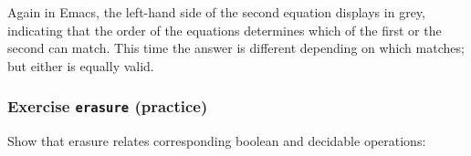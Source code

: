 Again in Emacs, the left-hand side of the second equation displays in
grey, indicating that the order of the equations determines which of the
first or the second can match. This time the answer is different
depending on which matches; but either is equally valid.

\hypertarget{exercise-erasure-practice}{%
\subsubsection{\texorpdfstring{Exercise \texttt{erasure}
(practice)}{Exercise erasure (practice)}}\label{exercise-erasure-practice}}

Show that erasure relates corresponding boolean and decidable
operations:

\begin{fence}
\begin{code}%
\>[0]\<%
\\
\>[0][@{}l@{\AgdaIndent{0}}]%
\>[2]\AgdaSpace{}%
\AgdaSymbol{:}\AgdaSpace{}%
\AgdaSpace{}%
\AgdaSymbol{\{}\AgdaSpace{}%
\AgdaSpace{}%
\AgdaSymbol{:}\AgdaSpace{}%
\AgdaSymbol{\}}\AgdaSpace{}%
\AgdaSymbol{(}\AgdaSpace{}%
\AgdaSymbol{:}\AgdaSpace{}%
\AgdaSpace{}%
\AgdaSymbol{)}\AgdaSpace{}%
\AgdaSymbol{(}\AgdaSpace{}%
\AgdaSymbol{:}\AgdaSpace{}%
\AgdaSpace{}%
\AgdaSymbol{)}\AgdaSpace{}%
\AgdaSpace{}%
\AgdaSpace{}%
\AgdaSpace{}%
\AgdaSpace{}%
\AgdaSpace{}%
\AgdaSpace{}%
\AgdaSpace{}%
\AgdaSpace{}%
\AgdaSpace{}%
\AgdaSpace{}%
\AgdaSpace{}%
\AgdaSpace{}%
\AgdaSpace{}%
\<%
\\
%
\>[2]\AgdaSpace{}%
\AgdaSymbol{:}\AgdaSpace{}%
\AgdaSpace{}%
\AgdaSymbol{\{}\AgdaSpace{}%
\AgdaSpace{}%
\AgdaSymbol{:}\AgdaSpace{}%
\AgdaSymbol{\}}\AgdaSpace{}%
\AgdaSymbol{(}\AgdaSpace{}%
\AgdaSymbol{:}\AgdaSpace{}%
\AgdaSpace{}%
\AgdaSymbol{)}\AgdaSpace{}%
\AgdaSymbol{(}\AgdaSpace{}%
\AgdaSymbol{:}\AgdaSpace{}%
\AgdaSpace{}%

\end{code}
\end{fence}
